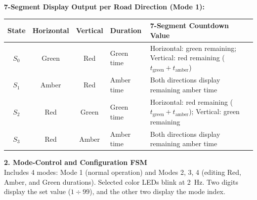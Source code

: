 \vspace{-0.35cm}
\noindent\textbf{7-Segment Display Output per Road Direction (Mode 1):}
\begin{center}
\footnotesize
\begin{tabularx}{\textwidth}{@{}cccp{2.4cm}X@{}}
\toprule
\textbf{State} & \textbf{Horizontal} & \textbf{Vertical} & \textbf{Duration} & \textbf{7-Segment Countdown Value} \\ \midrule
$S_0$ & Green & Red & Green time & Horizontal: green remaining; Vertical: red remaining ($t_{\text{green}} + t_{\text{amber}}$) \\
$S_1$ & Amber & Red & Amber time & Both directions display remaining amber time \\
$S_2$ & Red & Green & Green time & Horizontal: red remaining ($t_{\text{green}} + t_{\text{amber}}$); Vertical: green remaining \\
$S_3$ & Red & Amber & Amber time & Both directions display remaining amber time \\ \bottomrule
\end{tabularx}
\end{center}

\vspace{-0.15cm}
\noindent\textbf{2. Mode-Control and Configuration FSM} \\
\small Includes 4 modes: Mode 1 (normal operation) and Modes 2, 3, 4 (editing Red, Amber, and Green durations). Selected color LEDs blink at 2~Hz. Two digits display the set value ($1 \div 99$), and the other two display the mode index.

